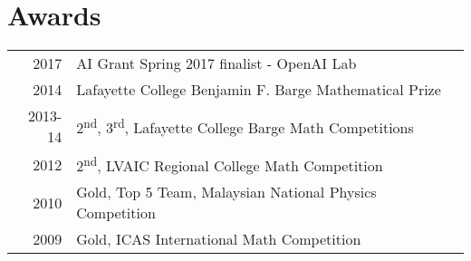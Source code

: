 \documentclass{deedy-resume-openfont}
\begin{document}
\begin{minipage}[t]{0.66\textwidth}

\section{Awards}
\begin{tabular}{rll}
2017	     & AI Grant Spring 2017 finalist - OpenAI Lab\\
2014	     & Lafayette College Benjamin F. Barge Mathematical Prize\\
2013-14	     & 2\textsuperscript{nd}, 3\textsuperscript{rd}, Lafayette College Barge Math Competitions\\
2012	     & 2\textsuperscript{nd}, LVAIC Regional College Math Competition\\
2010     & Gold, Top 5 Team, Malaysian National Physics Competition  \\
2009     & Gold, ICAS International Math Competition \\
\end{tabular}
\sectionsep


\renewcommand\refname{\vskip -1.5cm} %


\nocite{*}

\end{minipage}
\end{document}
